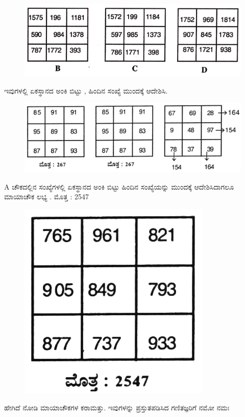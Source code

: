 \begin{figure}[H]
\includegraphics{src/figures/chap7/fig7-13.jpg}
\end{figure}

ಇವುಗಳಲ್ಲಿ ಏಕಸ್ಥಾನದ ಅಂಕಿ ಬಿಟ್ಟು , ಹಿಂದಿನ ಸಂಖ್ಯೆ ಮುಂದಕ್ಕೆ ಆದೇಶಿಸಿ.
\begin{figure}[H]
\includegraphics{src/figures/chap7/fig7-14.jpg}
\end{figure}

A ಚೌಕದಲ್ಲಿನ ಸಂಖ್ಯೆಗಳಲ್ಲಿ ಏಕಸ್ಥಾನದ ಅಂಕಿ ಬಿಟ್ಟು ಹಿಂದಿನ ಸಂಖ್ಯೆಯನ್ನು ಮುಂದಕ್ಕೆ ಆದೇಶಿಸಿದಾಗಲೂ ಮಾಯಾಚೌಕ ಲಭ್ಯ . ಮೊತ್ತ : 2547
\begin{figure}[H]
\includegraphics[scale=1.25]{src/figures/chap7/fig7-15.jpg}
\end{figure}

ಹೇಗಿದೆ ನೋಡಿ ಮಾಯಾಚೌಕಗಳ ಕರಾಮತ್ತು. ಇವುಗಳನ್ನು ಪ್ರಸ್ತುತಪಡಿಸಿದ ಗಣಿತಜ್ಞರಿಗೆ ನಮೋ ನಮಃ

